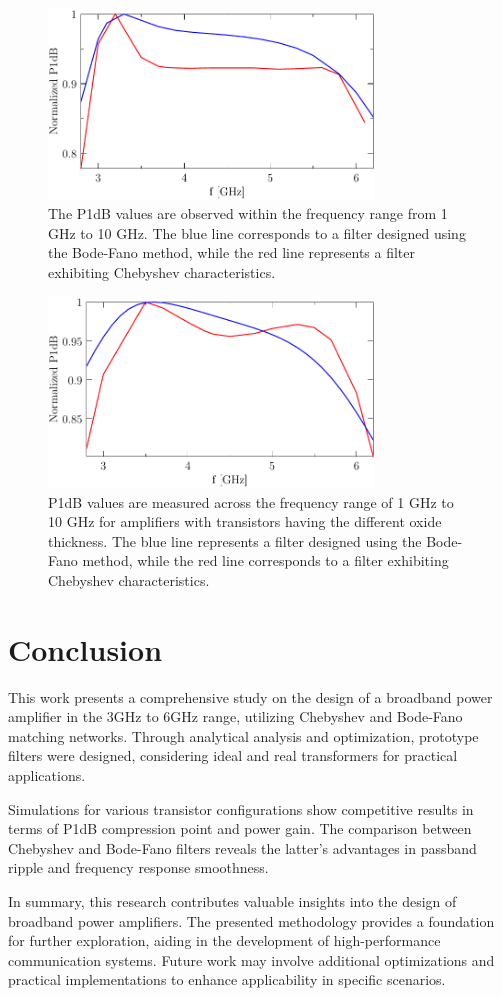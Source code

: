 \documentclass[lettersize,journal]{IEEEtran}
\begin{document}
\begin{figure}[!t]
\centering
\includegraphics[width=3.4in]{./fig/1V2_P1dB_2.pdf}
\caption{The P1dB values are observed within the frequency range from 1 GHz to 10 GHz. The blue line corresponds to a filter designed using the Bode-Fano method, while the red line represents a filter exhibiting Chebyshev characteristics.}
\label{fig:1v2_p1db_2}
\end{figure}

\begin{figure}[!t]
\centering
\includegraphics[width=3.4in]{./fig/2V5_P1dB_2.pdf}
\caption{P1dB values are measured across the frequency range of 1 GHz to 10 GHz for amplifiers with transistors having the different oxide thickness. The blue line represents a filter designed using the Bode-Fano method, while the red line corresponds to a filter exhibiting Chebyshev characteristics.}
\label{fig:2v5_p1db_2}
\end{figure}

\section{Conclusion}

This work presents a comprehensive study on the design of a broadband power amplifier in the 3GHz to 6GHz range, utilizing Chebyshev and Bode-Fano matching networks. Through analytical analysis and optimization, prototype filters were designed, considering ideal and real transformers for practical applications.

Simulations for various transistor configurations show competitive results in terms of P1dB compression point and power gain. The comparison between Chebyshev and Bode-Fano filters reveals the latter's advantages in passband ripple and frequency response smoothness.

In summary, this research contributes valuable insights into the design of broadband power amplifiers. The presented methodology provides a foundation for further exploration, aiding in the development of high-performance communication systems. Future work may involve additional optimizations and practical implementations to enhance applicability in specific scenarios.

 
\end{document}
